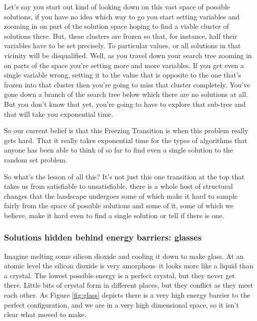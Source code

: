 \documentclass[]{article}
\begin{document}
Let's say you start out kind of looking
down on this
vast space of possible solutions, if you
have no idea which way to go
you start setting variables and zooming
in on part of the solution space
hoping to find a viable cluster of
solutions there.
But, these clusters are frozen so that,
for instance, half their variables
have to be set precisely.
To particular values, or all solutions in
that vicinity will be disqualified.
Well, as you travel down your search tree
zooming in on parts of the space
you're setting more and more variables.
If you get even a single variable wrong,
setting it to the value that is opposite
to the one that's frozen into
that cluster then you're going to miss
that cluster completely.
You've gone down a branch of the
search tree below which there are no
solutions at all.
But you don't know that yet,
you're going to have to explore
that sub-tree and that will take you
exponential time.

So our current belief is that this 
Freezing Transition
is when this problem really gets hard.
That it really takes exponential time for
the types of algorithms that
anyone has been able to think of so far
to find even a single solution to the
random set problem.

So what's the lesson of all this?
It's not just this one transition at
the top
that takes us from satisfiable to
unsatisfiable,
there is a whole host of structural
changes that the landscape undergoes
some of which make it hard to sample
fairly
from the space of possible solutions
and some of it, some of which
we believe, make it hard even to
find a single solution
or tell if there is one.

\subsubsection{Solutions hidden behind energy barriers: glasses}

Imagine melting some silicon dioxide and cooling it down to make glass. At an atomic level the silicon dioxide is very amorphous--it looks more like a liquid than a crystal. The lowest possible energy is a perfect crystal, but they never get there. Little bits of crystal form in different places, but they conflict as they meet each other. As Figure \ref{fig:glass} depicts there is a very high energy barrier to the perfect configuration, and we are in a very high dimensional space, so it isn't clear what moved to make.
\end{document}
